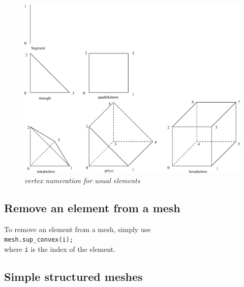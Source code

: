 \documentclass[11pt,a4paper]{article}
\begin{document}
\begin{figure}[htb] \label{fig:elem}
  \begin{center}
    \includegraphics[width=15cm,angle=0]{getfemuserelem.eps}
  \end{center}
  \caption{ \it vertex numeration for usual elements }
\end{figure}

\subsection{Remove an element from a mesh}
To remove an element from a mesh, simply use\\[0.5cm]
{\tt mesh.sup\_convex(i); }\\[0.5cm]
where {\tt i} is the index of the element.

\subsection{Simple structured meshes}
\end{document}
